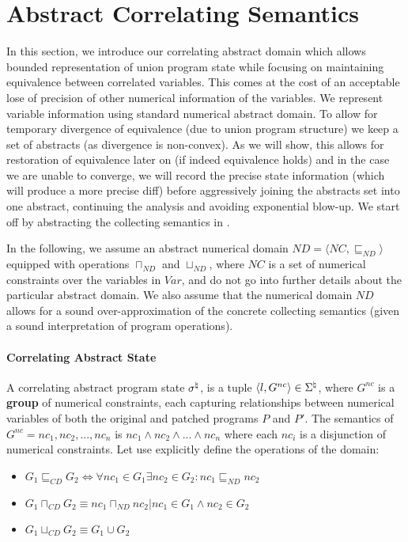 \section{Abstract Correlating Semantics}

In this section, we introduce our correlating abstract domain which allows bounded representation of union program state while focusing on maintaining equivalence between correlated variables. This comes at the cost of an acceptable lose of precision of other numerical information of the variables. We represent variable information using standard numerical abstract domain. To allow for temporary divergence of equivalence (due to union program structure) we keep a set of abstracts (as divergence is non-convex). As we will show, this allows for restoration of equivalence later on (if indeed equivalence holds) and in the case we are unable to converge, we will record the precise state information (which will produce a more precise diff) before aggressively joining the abstracts set into one abstract, continuing the analysis and avoiding exponential blow-up. We start off by abstracting the collecting semantics in .

In the following, we assume an abstract numerical domain $ND = \langle NC, \sqsubseteq_{ND} \rangle$ equipped with operations
$\sqcap_{ND}$ and $\sqcup_{ND}$, where $NC$ is a set of numerical constraints over the variables in $Var$, and do not go into further details about the particular abstract domain. We also assume that the numerical domain $ND$ allows for a sound over-approximation of the concrete collecting semantics (given a sound interpretation of program operations).

\paragraph{Correlating Abstract State} 
A correlating abstract program state $\sigma^\natural$, is a tuple $\langle l, G^{nc} \rangle \in \Sigma^\natural$, where $G^{nc}$ is a \textbf{group} of numerical constraints, each capturing relationships between numerical variables of both the original and patched programs $P$ and $P'$. The semantics of $G^{nc} = {nc_1,nc_2,...,nc_n}$ is $nc_1\wedge nc_2 \wedge ... \wedge nc_n$ where each $nc_i$ is a disjunction of numerical constraints. Let use explicitly define the operations of the domain:
\begin{itemize}
\item $G_1 \sqsubseteq_{CD} G_2 \Longleftrightarrow \forall nc_1 \in G_1 \exists nc_2 \in G_2 : nc_1 \sqsubseteq_{ND} nc_2$
\item $G_1 \sqcap_{CD} G_2 \equiv { nc_1 \sqcap_{ND} nc_2 | nc_1 \in G_1 \wedge nc_2 \in G_2}$
\item $G_1 \sqcup_{CD} G_2 \equiv G_1 \cup G_2$
\end{itemize}

